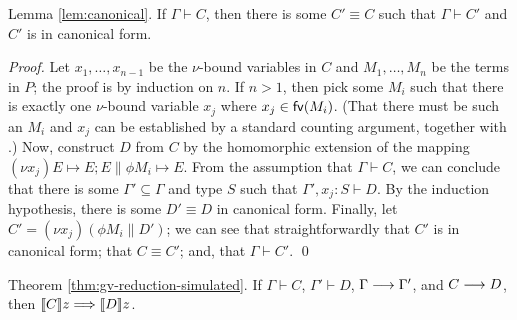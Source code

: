 \documentclass[oribibl,orivec,envcountsame]{llncs}
\begin{document}
\begin{fake}{Lemma \ref{lem:canonical}.}
  If $\Gamma \vdash C$, then there is some $C' \equiv C$ such that $\Gamma \vdash C'$ and $C'$ is in
  canonical form.
\end{fake}

\begin{proof}
  Let $x_1,\dots,x_{n-1}$ be the $\nu$-bound variables in $C$ and $M_1,\dots,M_n$ be the terms in
  $P$; the proof is by induction on $n$.  If $n > 1$, then pick some $M_i$ such that there is
  exactly one $\nu$-bound variable $x_j$ where $x_j \in \mathsf{fv}(M_i)$.  (That there must be such an
  $M_i$ and $x_j$ can be established by a standard counting argument, together with
  .)  Now, construct $D$ from $C$ by the homomorphic extension of
  the mapping $(\nu x_j)E \mapsto E; E \parallel \phi M_i \mapsto E$.  From the assumption
  that $\Gamma \vdash C$, we can conclude that there is some $\Gamma' \subseteq \Gamma$ and type $S$
  such that $\Gamma',x_j:S \vdash D$.  By the induction hypothesis, there is some $D' \equiv D$ in
  canonical form.  Finally, let $C' = (\nu x_j)(\phi M_i \parallel D')$; we can see that
  straightforwardly that $C'$ is in canonical form; that $C \equiv C'$; and, that $\Gamma \vdash
  C'$. \qed
\end{proof}

\begin{fake}{Theorem \ref{thm:gv-reduction-simulated}.}
  If $\Gamma \vdash C$, $\Gamma' \vdash D$, $\Gamma \longrightarrow \Gamma'$, and $C \longrightarrow D$, then $\llbracket C \rrbracket z
  \Longrightarrow \llbracket D \rrbracket z$.
\end{fake}
\end{document}
